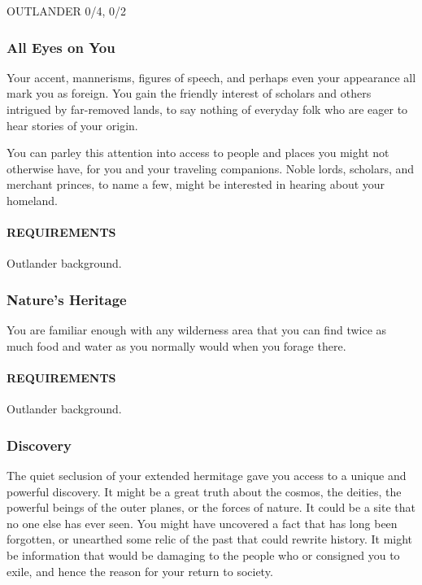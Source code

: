 OUTLANDER 0/4, 0/2
    \subsubsection{All Eyes on You} \label{feat::alleyesonyou}
    Your accent, mannerisms, figures of speech, and perhaps even your appearance all mark you as foreign.
    You gain the friendly interest of scholars and others intrigued by far-removed lands, to say nothing of everyday folk who are eager to hear stories of your origin.

    You can parley this attention into access to people and places you might not otherwise have, for you and your traveling companions.
    Noble lords, scholars, and merchant princes, to name a few, might be interested in hearing about your homeland.
    \paragraph{REQUIREMENTS} Outlander background.

    \subsubsection{Nature's Heritage} \label{feat::naturesheritage}
    You are familiar enough with any wilderness area that you can find twice as much food and water as you normally would when you forage there.
    \paragraph{REQUIREMENTS} Outlander background.

    \subsubsection{Discovery} \label{feat::discovery} %
    The quiet seclusion of your extended hermitage gave you access to a unique and powerful discovery.
    It might be a great truth about the cosmos, the deities, the powerful beings of the outer planes, or the forces of nature.
    It could be a site that no one else has ever seen.
    You might have uncovered a fact that has long been forgotten, or unearthed some relic of the past that could rewrite history.
    It might be information that would be damaging to the people who or consigned you to exile, and hence the reason for your return to society.

